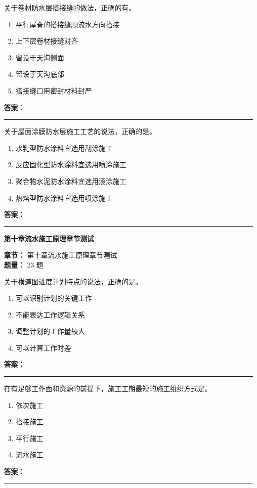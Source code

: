 \documentclass[UTF8,fontset=fandol,11pt]{ctexart}
\newcommand{\chaptertitle}[1]{\vspace{0.5em}\begin{tcolorbox}[enhanced,colback=deepblue,colframe=deepblue,arc=2mm,boxrule=0pt]\begin{center}\Large\bfseries\color{white}#1\end{center}\end{tcolorbox}\vspace{0.5em}}
\newcommand{\answerline}{\textcolor{answerred}{\rule{2.4cm}{0.7pt}}}
\begin{document}
\begin{quizbox}[title={第 6 题}]
关于卷材防水层搭接缝的做法，正确的有。\\
\begin{enumerate}[label=\Alph*.]
\item 平行屋脊的搭接缝顺流水方向搭接
\item 上下层卷材接缝对齐
\item 留设于天沟侧面
\item 留设于天沟底部
\item 搭接缝口用密封材料封严
\end{enumerate}
\textbf{\textcolor{answerred}{答案：}} \answerline
\end{quizbox}

\begin{quizbox}[title={第 7 题}]
关于屋面涂膜防水层施工工艺的说法，正确的是。\\
\begin{enumerate}[label=\Alph*.]
\item 水乳型防水涂料宜选用刮涂施工
\item 反应固化型防水涂料宜选用喷涂施工
\item 聚合物水泥防水涂料宜选用滚涂施工
\item 热熔型防水涂料宜选用喷涂施工
\end{enumerate}
\textbf{\textcolor{answerred}{答案：}} \answerline
\end{quizbox}

\chaptertitle{第十章流水施工原理章节测试}
\begin{mainbox}
\textbf{\textcolor{mainblue}{章节：}} 第十章流水施工原理章节测试\\
\textbf{\textcolor{answerred}{题量：}} 23 题
\end{mainbox}

\begin{quizbox}[title={第 1 题}]
关于横道图进度计划特点的说法，正确的是。\\
\begin{enumerate}[label=\Alph*.]
\item 可以识别计划的关键工作
\item 不能表达工作逻辑关系
\item 调整计划的工作量较大
\item 可以计算工作时差
\end{enumerate}
\textbf{\textcolor{answerred}{答案：}} \answerline
\end{quizbox}

\begin{quizbox}[title={第 2 题}]
在有足够工作面和资源的前提下，施工工期最短的施工组织方式是。\\
\begin{enumerate}[label=\Alph*.]
\item 依次施工
\item 搭接施工
\item 平行施工
\item 流水施工
\end{enumerate}
\textbf{\textcolor{answerred}{答案：}} \answerline
\end{quizbox}
\end{document}
